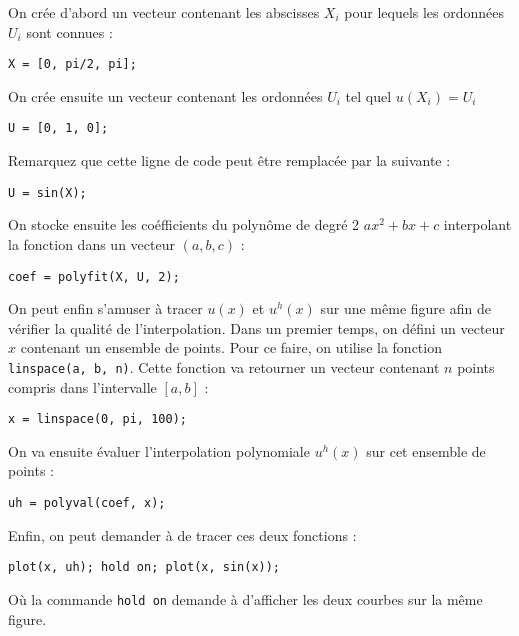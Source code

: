 On crée d'abord un vecteur contenant les abscisses $X_i$ pour lequels les ordonnées
$U_i$ sont connues :

\begin{lstlisting}
X = [0, pi/2, pi];
\end{lstlisting}

On crée ensuite un vecteur contenant les ordonnées $U_i$ tel quel $u(X_i) = U_i$

\begin{lstlisting}
U = [0, 1, 0]; 
\end{lstlisting}

Remarquez que cette ligne de code peut être remplacée par la suivante :

\begin{lstlisting}
U = sin(X); 
\end{lstlisting}

On stocke ensuite les coéfficients du polynôme de degré 2 $ax^2 + bx + c$ interpolant la fonction
dans un vecteur $(a, b, c)$ :

\begin{lstlisting}
coef = polyfit(X, U, 2); 
\end{lstlisting}

On peut enfin s'amuser à tracer $u(x)$ et $u^h(x)$ sur une même figure afin de vérifier la 
qualité de l'interpolation. Dans un premier temps, on défini un vecteur $x$ contenant un
ensemble de points. Pour ce faire, on utilise la fonction \lstinline{linspace(a, b, n)}. 
Cette fonction va retourner un vecteur contenant $n$ points compris dans l'intervalle
$[a, b]$ :

\begin{lstlisting}
x = linspace(0, pi, 100); 
\end{lstlisting}

On va ensuite évaluer l'interpolation polynomiale $u^h(x)$ sur cet ensemble de points :

\begin{lstlisting}
uh = polyval(coef, x); 
\end{lstlisting}

Enfin, on peut demander à \matlab{} de tracer ces deux fonctions :

\begin{lstlisting}
plot(x, uh); hold on; plot(x, sin(x));
\end{lstlisting}

Où la commande \lstinline{hold on} demande à \matlab{} d'afficher les deux courbes
sur la même figure.

